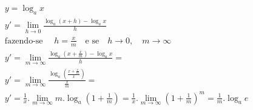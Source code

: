 \begin{ex}
\begin{align}
&y=\log_a {x}\nonumber\\
&y'=\lim_{h\rightarrow 0} \frac{\log_a(x+h)-\log_a{x}}{h}\nonumber\\
&\text{fazendo-se }\quad h=\frac{x}{m}\quad\text{e se}\quad h\rightarrow 0,\quad m\rightarrow \infty\nonumber\\
&y'=\lim_{m\rightarrow \infty} \frac{\log_a{\left(x+\frac{x}{m}\right)}-\log_a{x}}{h}=\nonumber\\
&y'=\lim_{m\rightarrow \infty} \frac{\log_a{\left(\frac{x+\frac{x}{m}}{x}\right)}}{\frac{x}{m}}=\nonumber\\
&y'=\frac{1}{x}.\lim_{m\rightarrow \infty} m.\log_a\left(1+\frac{1}{m}\right)=\frac{1}{x}.\lim_{m\rightarrow \infty} \left(1+\frac{1}{m}\right)^m=\frac{1}{m}.\log_a{e}\nonumber
\end{align}
\end{ex}